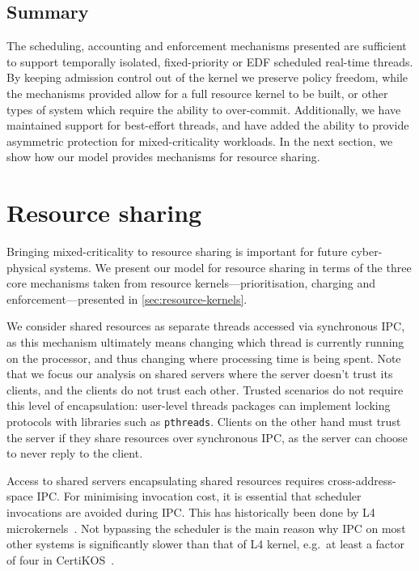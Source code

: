 \subsection{Summary}

The scheduling, accounting and enforcement mechanisms presented are sufficient to support temporally
isolated, fixed-priority or \gls{EDF} scheduled real-time threads. By keeping admission control
out of the kernel we preserve policy freedom, while the mechanisms provided allow for a full
resource kernel to be built, or other types of system which require the ability to over-commit.
Additionally, we have maintained
support for best-effort threads, and have added the ability to provide asymmetric protection for
mixed-criticality workloads. 
In the next section, we show how our model provides mechanisms for resource sharing. 

\section{Resource sharing}\label{s:locking}

Bringing mixed-criticality to resource sharing is important for future cyber-physical systems. We 
present our model for resource sharing in terms of the three core mechanisms taken from resource
kernels---prioritisation, charging and enforcement---presented in \cref{sec:resource-kernels}.

We consider shared resources as separate threads accessed via synchronous \gls{IPC}, as this
mechanism ultimately means changing which thread is currently running on the processor, and thus
changing where processing time is being spent. Note that we focus our analysis on shared servers
where the server doesn't trust its clients, and the clients do not trust each other. Trusted
scenarios do not require this level of encapsulation: user-level threads packages can implement
locking protocols with libraries such as \texttt{pthreads}. Clients on the other hand must trust the
server if they share resources over synchronous \gls{IPC}, as the server can choose to never reply
to the client.

Access to shared servers encapsulating shared resources requires
cross-address-space IPC. For minimising invocation cost, it is
essential that scheduler invocations are avoided during IPC. This has
historically been done by L4
microkernels~\citep{Heiser_Elphinstone_16}. Not bypassing the
scheduler is the main reason why IPC on most other systems is
significantly slower than that of L4 kernel, e.g.\ at least a factor
of four in CertiKOS~\citep{Gu_SCWKSC_16}.

